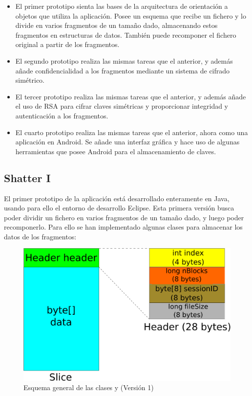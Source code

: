 \begin{itemize}
  \item El primer prototipo sienta las bases de la arquitectura de orientación a objetos que utiliza la aplicación. Posee un esquema que recibe un fichero y lo divide en varios fragmentos de un tamaño dado, almacenando estos fragmentos en estructuras de datos. También puede recomponer el fichero original a partir de los fragmentos.

  \item El segundo prototipo realiza las mismas tareas que el anterior, y además añade confidencialidad a los fragmentos mediante un sistema de cifrado simétrico.

  \item El tercer prototipo realiza las mismas tareas que el anterior, y además añade el uso de RSA para cifrar claves simétricas y proporcionar integridad y autenticación a los fragmentos.

  \item El cuarto prototipo realiza las mismas tareas que el anterior, ahora como una aplicación en Android. Se añade una interfaz gráfica y hace uso de algunas herramientas que posee Android para el almacenamiento de claves.
\end{itemize}

\subsection{Shatter I}

El primer prototipo de la aplicación está desarrollado enteramente en Java, usando para ello el entorno de desarrollo Eclipse. Esta primera versión busca poder dividir un fichero en varios fragmentos de un tamaño dado, y luego poder recomponerlo. Para ello se han implementado algunas clases para almacenar los datos de los fragmentos:

\begin{figure}[!htb]
  \centering
  \includegraphics[scale=0.4]{Figures/Slice_Header_1}
  \decoRule
  \caption[ -  (Versión 1)]{Esquema general de las clases  y  (Versión 1)}
  \label{fig:Slice_Header_1}
\end{figure}

